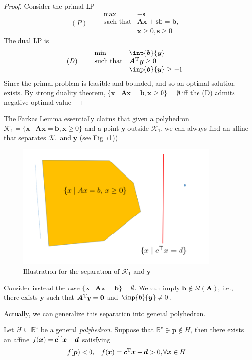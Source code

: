 \begin{proof}
Consider the primal LP
\[
(P)\qquad
\begin{array}{ll}
\max&-\bm s\\
\mbox{such that}&\bm A\bm x+\bm s\bm b=\bm b,\\
&\bm x\ge0,\bm s\ge0
\end{array}
\]
The dual LP is
\[
(D)\qquad
\begin{array}{ll}
\min&\inp{\bm b}{\bm y}\\
\mbox{such that}&\bm A\trans\bm y\ge0\\
&\inp{\bm b}{\bm y}\ge-1 
\end{array}
\]
Since the primal problem is feasible and bounded, and so an optimal solution exists.
By strong duality theorem, $\{\bm x\mid\bm A\bm x=\bm b,\bm x\ge0\}=\emptyset$ iff the (D) admits negative optimal value. 
\end{proof}

\begin{remark}
The Farkas Lemma essentially claims that given a polyhedron $\mathcal{K}_1=\{\bm x\mid\bm A\bm x=\bm b,\bm x\ge0\}$ and a point $\bm y$ outside $\mathcal{K}_1$, we can always find an affine that separates $\mathcal{K}_1$ and $\bm y$ (see Fig~(\ref{fig:2:9}))
\begin{figure}
\centering
\includegraphics[width=0.9\textwidth]{Second_lecture/p_9}
\caption{Illustration for the separation of $\mathcal{K}_1$ and $\bm y$}
\label{fig:2:9}
\end{figure}
\begin{remark}
Consider instead the case $\{\bm x\mid\bm{Ax}=\bm b\}=\emptyset$. We can imply $\bm b\notin\mathcal{R}(\bm A)$, i.e., there exists $\bm y$ such that $\bm A^{\mathrm T}\bm y=\bm0$ and $\inp{\bm b}{\bm y}\ne0$.
\end{remark}

Actually, we can generalize this separation into general polyhedron.
\end{remark}
\begin{theorem}
Let $H\subseteq\mathbb{R}^n$ be a general \emph{polyhedron}. Suppose that $\mathbb{R}^n\ni \bm p\notin H$, then there exists an affine $f(\bm x)=\bm c^{\mathrm T}\bm x+\bm d$ satisfying
\[
\begin{array}{ll}
f(\bm p)<0,&
f(\bm x)=\bm c^{\mathrm T}\bm x+\bm d>0,\forall\bm x\in H
\end{array}
\]
\end{theorem}

